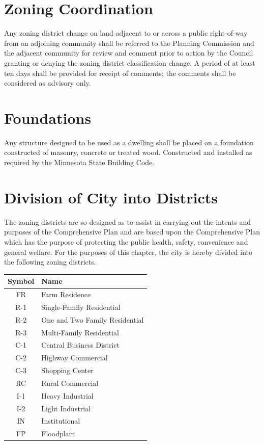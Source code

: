 \section{Zoning Coordination}
Any zoning district change on land adjacent to or across a public right-of-way from an adjoining community shall be referred to the Planning Commission and the adjacent community for review and comment prior to action by the Council granting or denying the zoning district classification change.  A period of at least ten days shall be provided for receipt of comments; the comments shall be considered as advisory only.

\section{Foundations}
Any structure designed to be used as a dwelling shall be placed on a foundation constructed of masonry, concrete or treated wood. Constructed and installed as required by the Minnesota State Building Code.


\setcounter{section}{19}
\section{Division of City into Districts}
The zoning districts are so designed as to assist in carrying out the intents and purposes of the Comprehensive Plan and are based upon the Comprehensive Plan which has the purpose of protecting the public health, safety, convenience and general welfare. For the purposes of this chapter, the city is hereby divided into the following zoning districts.
\begin{center}
    \begin{tabular}{|c|p{5cm}|}
    \hline
    \textbf{Symbol} & \textbf{Name}\\
    \hline
    FR & Farm Residence\\
    \hline
   R-1 & Single-Family Residential\\
    \hline
   R-2 & One and Two Family Residential\\
    \hline
   R-3 & Multi-Family Residential\\
    \hline
   C-1 & Central Business District\\
    \hline
   C-2 & Highway Commercial\\
    \hline
   C-3 & Shopping Center\\
    \hline
    RC & Rural Commercial\\
    \hline
   I-1 & Heavy Industrial\\
    \hline
   I-2 & Light Industrial\\
    \hline
    IN & Institutional\\
    \hline
    FP & Floodplain\\
    \hline
\end{tabular}
\end{center}

